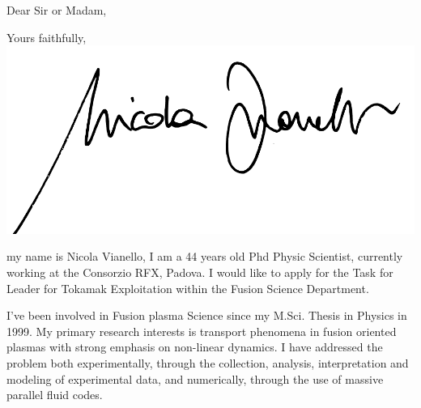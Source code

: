 \documentclass[12pt,a4paper,sans]{moderncv}        %
\begin{document}
\date{June 12, 2020}
\opening{Dear Sir or Madam,}
\closing{Yours faithfully, \\
  \vspace{2pt}
  \includegraphics[height=4\baselineskip]{signature.pdf}}
\makelettertitle
\justify
my name is Nicola Vianello, I am a 44 years old Phd Physic Scientist,
currently working at the Consorzio RFX, Padova. I would like to apply for
the Task for Leader for Tokamak Exploitation within the Fusion Science
Department. 

I've been involved in Fusion plasma Science since my M.Sci. Thesis in
Physics in 1999. My primary research interests is transport phenomena in fusion
oriented plasmas with strong emphasis on non-linear dynamics. I have
addressed the problem both experimentally, through the collection, 
analysis, interpretation and modeling of experimental data, and
numerically, through the use of massive parallel fluid codes. 
\end{document}
